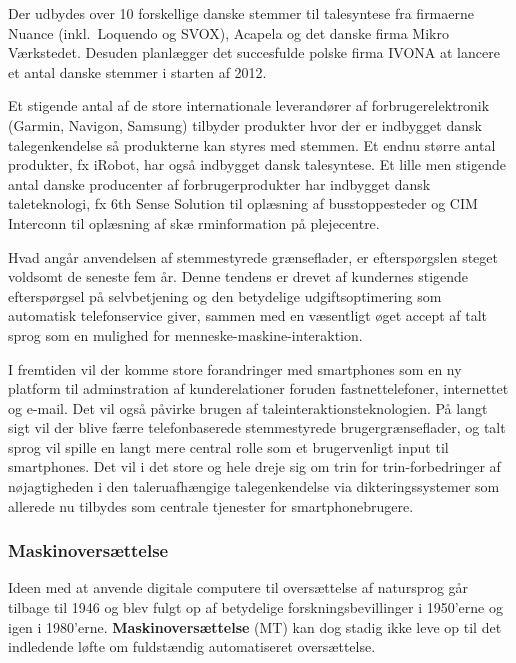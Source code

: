 \begin{multicols}{2}
Der udbydes over 10 forskellige danske stemmer til talesyntese fra
firmaerne Nuance (inkl.\ Loquendo og SVOX), Acapela og det danske firma
Mikro V\ae rkstedet. Desuden planl\ae gger det succesfulde polske
firma IVONA at lancere et antal danske stemmer i starten af 2012.

Et stigende antal af de store internationale leverand\o rer af
forbrugerelektronik (Garmin, Navigon, Samsung) tilbyder produkter hvor
der er indbygget dansk talegenkendelse \mbox{s\aa} produkterne kan
styres med stemmen. Et endnu st\o rre antal produkter, fx iRobot, har
\mbox{ogs\aa} indbygget dansk talesyntese. Et lille men stigende antal
danske producenter af forbrugerprodukter har indbygget dansk
taleteknologi, fx 6th Sense Solution til opl\ae sning af
busstoppesteder og CIM Interconn til opl\ae sning af sk\ae
rminformation \mbox{p\aa} plejecentre.

Hvad ang\aa r anvendelsen af stemmestyrede gr\ae nseflader, er eftersp\o rgslen steget voldsomt de seneste fem \aa r. Denne tendens er drevet af kundernes stigende eftersp\o rgsel \mbox{p\aa} selvbetjening og den betydelige udgiftsoptimering som automatisk telefonservice giver, sammen med en v\ae sentligt \o get accept af talt sprog som en mulighed for menneske-maskine-interaktion.

I fremtiden vil der komme store forandringer med smartphones som en ny platform til adminstration af kunderelationer foruden fastnettelefoner, internettet og e-mail. Det vil \mbox{ogs\aa} p\aa virke brugen af taleinteraktionsteknologien. \mbox{P\aa} langt sigt vil der blive f\ae rre telefonbaserede stemmestyrede brugergr\ae nseflader, og talt sprog vil spille en langt mere central rolle som et brugervenligt input til smartphones. Det vil i det store og hele dreje sig om trin for trin-forbedringer af n\o jagtigheden i den taleruafh\ae ngige talegenkendelse via dikteringssy\-stemer som allerede nu tilbydes som centrale tjenester for smartphonebrugere.

\subsubsection{Maskinovers\ae ttelse}

Ideen med at anvende digitale computere til overs\ae ttelse af natursprog g\aa r tilbage til 1946 og blev fulgt op af betydelige forskningsbevillinger i 1950'erne og igen i 1980'erne. {\bf Maskinovers\ae ttelse} (MT) kan dog stadig ikke leve op til det indledende l\o fte om fuldst\ae ndig automatiseret overs\ae ttelse.


\end{multicols}
